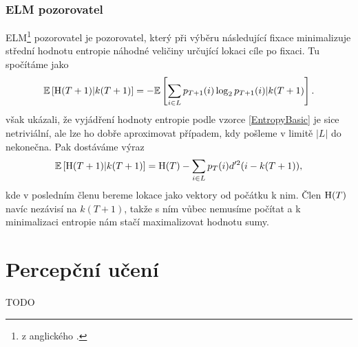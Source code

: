 \subsubsection{ELM pozorovatel}

ELM\footnote{z anglického .} pozorovatel je
pozorovatel, který při výběru následující fixace minimalizuje střední hodnotu
entropie náhodné veličiny určující lokaci cíle po fixaci. Tu spočítáme jako
\begin{equation}\label{EntropyBasic}\mathbb{E}\left[\operatorname{H}(T+1)|k(T+1)\right]=-\mathbb{E}\left[\displaystyle\sum_{i\in
L}p_{T+1}(i)\log_2p_{T+1}(i)|k(T+1)\right].\end{equation} \citet{Najemnik09} však ukázali,
že vyjádření hodnoty entropie podle vzorce \eqref{EntropyBasic} je sice
netriviální, ale lze ho dobře aproximovat případem, kdy pošleme v limitě $|L|$
do nekonečna. Pak dostáváme výraz $$ \mathbb{E}\left[\operatorname{H}(T+1)|k(T+1)\right]= \operatorname{H}(T) -
\displaystyle\sum_{i\in L} p_T(i)d'^2(i-k(T+1)),$$ kde v posledním členu bereme
lokace jako vektory od počátku k nim. Člen $\operatorname{H}(T)$ navíc nezávisí na $k(T+1)$,
takže s ním vůbec nemusíme počítat a k minimalizaci entropie nám stačí
maximalizovat hodnotu sumy.


\section{Percepční učení}

TODO
